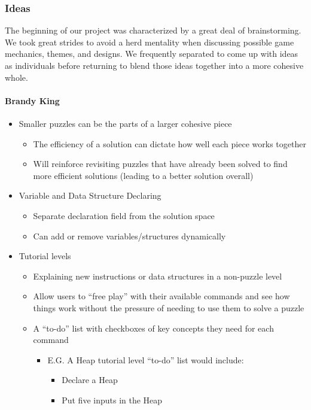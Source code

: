 \subsubsection{Ideas}
The beginning of our project was characterized by a great deal of brainstorming. We took great strides
to avoid a herd mentality when discussing possible game mechanics, themes, and designs. We frequently 
separated to come up with ideas as individuals before returning to blend those ideas together into a more
cohesive whole.

\paragraph{Brandy King}
\begin{itemize}
  \item Smaller puzzles can be the parts of a larger cohesive piece
  \begin{itemize}
    \item The efficiency of a solution can dictate how well each piece works
    together
    \item Will reinforce revisiting puzzles that have already been solved to
    find more efficient solutions (leading to a better solution overall)
  \end{itemize}
  \item Variable and Data Structure Declaring
  \begin{itemize}
    \item Separate declaration field from the solution space
    \item Can add or remove variables/structures dynamically
  \end{itemize}
  \item Tutorial levels
  \begin{itemize}
    \item Explaining new instructions or data structures in a non-puzzle level
    \item Allow users to “free play” with their available commands and see how
    things work without the pressure of needing to use them to solve a puzzle
    \item A “to-do” list with checkboxes of key concepts they need for each
    command
    \begin{itemize}
      \item E.G. A Heap tutorial level “to-do” list would include:
      \begin{itemize}
        \item Declare a Heap
        \item Put five inputs in the Heap

\end{itemize}
\end{itemize}
\end{itemize}
\end{itemize}
